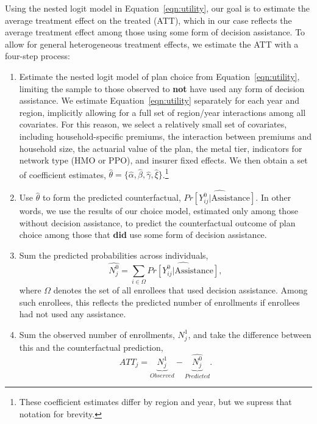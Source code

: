 \documentclass[12pt]{article}
\begin{document}
Using the nested logit model in Equation~\eqref{eqn:utility}, our goal is to estimate the average treatment effect on the treated (ATT), which in our case reflects the average treatment effect among those using some form of decision assistance. To allow for general heterogeneous treatment effects, we estimate the ATT with a four-step process: 
\begin{enumerate}
    \item Estimate the nested logit model of plan choice from Equation~\eqref{eqn:utility}, limiting the sample to those observed to \textbf{not} have used any form of decision assistance. We estimate Equation~\eqref{eqn:utility} separately for each year and region, implicitly allowing for a full set of region/year interactions among all covariates. For this reason, we select a relatively small set of covariates, including household-specific premiums, the interaction between premiums and household size, the actuarial value of the plan, the metal tier, indicators for network type (HMO or PPO), and insurer fixed effects. We then obtain a set of coefficient estimates, $\hat{\theta} = \{\hat{\alpha}, \hat{\beta}, \hat{\gamma}, \hat{\xi} \}$.\footnote{These coefficient estimates differ by region and year, but we supress that notation for brevity.}

    \item Use $\hat{\theta}$ to form the predicted counterfactual, $\widehat{Pr[Y_{ij}^{0} | \text{Assistance}]}$. In other words, we use the results of our choice model, estimated only among those without decision assistance, to predict the counterfactual outcome of plan choice among those that \textbf{did} use some form of decision assistance.

    \item Sum the predicted probabilities across individuals, $$\widehat{N_{j}^{0}} = \sum_{ i \in \Omega} \widehat{Pr[Y_{ij}^{0} | \text{Assistance}]},$$ where $\Omega$ denotes the set of all enrollees that used decision assistance. Among such enrollees, this reflects the predicted number of enrollments if enrollees had not used any assistance.
    
    \item Sum the observed number of enrollments, $N_{j}^{1}$, and take the difference between this and the counterfactual prediction,
    \begin{equation}
        ATT_{j} = \underbrace{N^{1}_{j}}_{Observed} - \underbrace{\widehat{N_{j}^{0}}}_{Predicted}.
    \label{eqn:att}
    \end{equation}
\end{enumerate}
\end{document}

